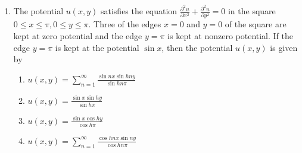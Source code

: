 \documentclass[journal,12pt,onecolumn]{IEEEtran}
\theoremstyle{remark}
\begin{document}
\begin{enumerate}
\item The potential $u(x,y)$ satisfies the equation $\frac{\partial^2 u}{\partial x^2}+\frac{\partial^2 u}{\partial y^2}=0$ in the square $0 \leq x \leq \pi, 0\leq y \leq \pi.$ Three of the edges $x=0$ and $y=0$ of the square are kept at zero potential and the edge $y=\pi$ is kept at nonzero potential. If the edge $y=\pi$ is kept at the potential $\sin x$, then the potential $u(x,y)$ is given by 
\begin{enumerate}
    \item$u(x,y)=\sum_{n=1}^\infty \frac{\sin nx \sin h ny}{\sin h n \pi}$
    \item$u(x,y)=\frac{\sin x \sin h y}{\sin h \pi}$
    \item$u(x,y)=\frac{\sin x \cos h y}{\cos h \pi}$
    \item$u(x,y)=\sum_{n=1}^\infty \frac{\cos hnx \sin ny}{\cos h n \pi}$
\end{enumerate}
\end{enumerate}
\end{document}
